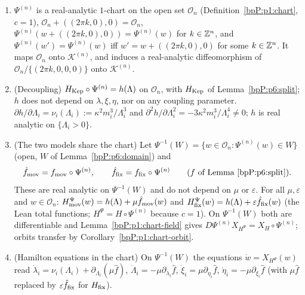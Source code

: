 \begin{theorem}\label{bpP:p7:product-chart}
\begin{enumerate}[label=(\alph*)]
\item $\Psi^{(n)}$ is a real-analytic $1$-chart on the open set $\mathcal O_n$ (Definition~\ref{bpP:p1:chart}, $c=1$), $\mathcal O_n+((2\pi k,0),0)=\mathcal O_n$, $\Psi^{(n)}(w+((2\pi k,0),0))=\Psi^{(n)}(w)$ for $k\in\mathbb{Z}^n$, and $\Psi^{(n)}(w')=\Psi^{(n)}(w)$ iff $w'=w+((2\pi k,0),0)$ for some $k\in\mathbb{Z}^n$. It maps $\mathcal O_n$ onto $\mathcal K^{(n)}$, and induces a real-analytic diffeomorphism of $\mathcal O_n/\{(2\pi k,0,0,0)\}$ onto $\mathcal K^{(n)}$.
\item \textup{(Decoupling)} $H_{\rm Kep}\circ\Psi^{(n)}=h(\Lambda)$ on $\mathcal O_n$, with $H_{\rm Kep}$ of Lemma~\ref{bpP:p6:split}; $h$ does not depend on $\lambda,\xi,\eta$, nor on any coupling parameter. $\partial h/\partial\Lambda_i=\nu_i(\Lambda_i):=\kappa^2m_i^3/\Lambda_i^3$ and $\partial^2h/\partial\Lambda_i^2=-3\kappa^2m_i^3/\Lambda_i^4\ne0$; $h$ is real analytic on $\{\Lambda_i>0\}$.
\item \textup{(The two models share the chart)} Let $\Psi^{-1}(W)=\{w\in\mathcal O_n:\Psi^{(n)}(w)\in W\}$ (open, $W$ of Lemma~\ref{bpP:p6:domain}) and
\[\hat f_{\rm mov}=f_{\rm mov}\circ\Psi^{(n)},\qquad\hat f_{\rm fix}=f_{\rm fix}\circ\Psi^{(n)}\qquad(f\ \text{of Lemma~\ref{bpP:p6:split}}).\]
These are real analytic on $\Psi^{-1}(W)$ and do not depend on $\mu$ or $\varepsilon$. For all $\mu,\varepsilon$ and $w\in\mathcal O_n$: $H_{\rm mov}^{\Psi}(w)=h(\Lambda)+\mu\hat f_{\rm mov}(w)$ and $H_{\rm fix}^{\Psi}(w)=h(\Lambda)+\varepsilon\hat f_{\rm fix}(w)$ (the Lean total functions; $H^\Psi=H\circ\Psi^{(n)}$ because $c=1$). On $\Psi^{-1}(W)$ both are differentiable and Lemma~\ref{bpP:p1:chart-field} gives $D\Psi^{(n)}X_{H^{\Psi}}=X_H\circ\Psi^{(n)}$; orbits transfer by Corollary~\ref{bpP:p1:chart-orbit}.
\item \textup{(Hamilton equations in the chart)} On $\Psi^{-1}(W)$ the equations $\dot w=X_{H^\Psi}(w)$ read $\dot\lambda_i=\nu_i(\Lambda_i)+\partial_{\Lambda_i}(\mu\hat f)$, $\dot\Lambda_i=-\mu\partial_{\lambda_i}\hat f$, $\dot\xi_i=\mu\partial_{\eta_i}\hat f$, $\dot\eta_i=-\mu\partial_{\xi_i}\hat f$ (with $\mu\hat f$ replaced by $\varepsilon\hat f_{\rm fix}$ for $H_{\rm fix}$).
\end{enumerate}
\end{theorem}
